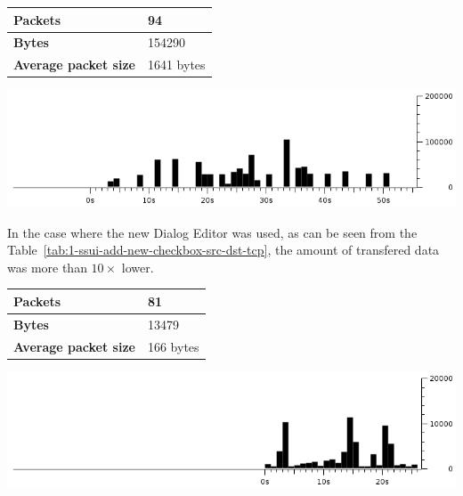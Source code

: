 \vspace{\baselineskip}
\noindent\begin{minipage}{\linewidth}
  \centering
  \begin{tabular}{|l|l|}
    \hline
    {\bf Packets}             & 94         \\ \hline
    {\bf Bytes}               & 154290     \\ \hline
    {\bf Average packet size} & 1641 bytes \\ \hline
  \end{tabular}
  \label{tab:0-rails-add-new-checkbox-src-dst-tcp}
  \includegraphics[width=15cm,keepaspectratio]{fig/0-rails-add-new-checkbox-src-dst-tcp}
  \label{fig:0-rails-add-new-checkbox-src-dst-tcp}
\end{minipage}
\vspace{\baselineskip}

In the case where the new Dialog Editor was used, as can be seen from the
Table~\ref{tab:1-ssui-add-new-checkbox-src-dst-tcp}, the amount of transfered
data was more than $10\times$ lower.

\vspace{\baselineskip}
\noindent\begin{minipage}{\linewidth}
  \centering
  \begin{tabular}{|l|l|}
    \hline
    {\bf Packets}             & 81        \\ \hline
    {\bf Bytes}               & 13479     \\ \hline
    {\bf Average packet size} & 166 bytes \\ \hline
  \end{tabular}
  \label{tab:1-ssui-add-new-checkbox-src-dst-tcp}
  \includegraphics[width=15cm,keepaspectratio]{fig/1-ssui-add-new-checkbox-src-dst-tcp}
  \label{fig:1-ssui-add-new-checkbox-src-dst-tcp}
\end{minipage}
\vspace{\baselineskip}

